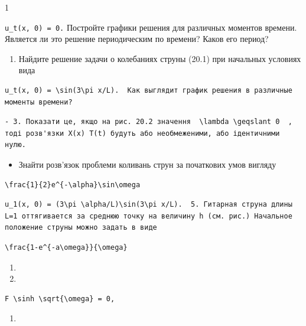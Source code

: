 \documentclass[
  ukrainian,
]{article}
\providecommand{\tightlist}{%
  \setlength{\itemsep}{0pt}\setlength{\parskip}{0pt}}
\begin{document}
1

\texttt{u\_t(x,\ 0)\ =\ 0.} Постройте графики решения для различных
моментов времени. Является ли это решение периодическим по времени?
Каков его период?

\begin{enumerate}
\def\labelenumi{\arabic{enumi}.}
\setcounter{enumi}{1}
\tightlist
\item
  Найдите решение задачи о колебаниях струны (20.1) при начальных
  условиях вида
\end{enumerate}

\begin{verbatim}
u_t(x, 0) = \sin(3\pi x/L).  Как выглядит график решения в различные моменты времени?
\end{verbatim}

\begin{verbatim}
- 3. Показати це, якщо на рис. 20.2 значення  \lambda \geqslant 0  , тоді розв'язки X(x) T(t) будуть або необмеженими, або ідентичними нулю.
\end{verbatim}

\begin{itemize}
\tightlist
\item
  Знайти розв'язок проблеми коливань струн за початкових умов вигляду
\end{itemize}

\begin{verbatim}
\frac{1}{2}e^{-\alpha}\sin\omega
\end{verbatim}

\begin{verbatim}
u_1(x, 0) = (3\pi \alpha/L)\sin(3\pi x/L).  5. Гитарная струна длины L=1 оттягивается за среднюю точку на величину h (см. рис.) Начальное положение струны можно задать в виде
\end{verbatim}

\begin{verbatim}
\frac{1-e^{-a\omega}}{\omega}
\end{verbatim}

\begin{enumerate}
\def\labelenumi{\arabic{enumi}.}
\setcounter{enumi}{13}
\tightlist
\item
\item
\end{enumerate}

\begin{verbatim}
F \sinh \sqrt{\omega} = 0,
\end{verbatim}

\begin{enumerate}
\def\labelenumi{\arabic{enumi}.}
\setcounter{enumi}{16}
\tightlist
\item
\end{enumerate}
\end{document}
